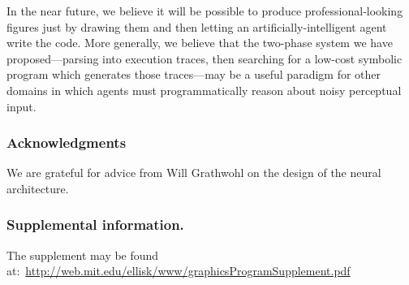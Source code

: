 \documentclass{article}
\begin{document}
In the near future, we believe it will be possible to produce professional-looking figures just by drawing them and then letting an artificially-intelligent agent write the code.
More generally, we believe that the two-phase system we have proposed---parsing into execution traces, then searching for a low-cost symbolic program which generates those traces---may be a useful paradigm for other domains in which agents must programmatically reason about noisy perceptual input.


\subsubsection*{Acknowledgments} We are grateful for advice from Will Grathwohl on the design of the neural architecture.

\subsubsection*{Supplemental information.} The supplement may be found at:~\url{http://web.mit.edu/ellisk/www/graphicsProgramSupplement.pdf}


%


 {\small }
\end{document}
